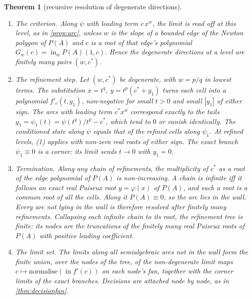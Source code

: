 \documentclass[11pt]{article}
\newtheorem{theorem}{Theorem}\newtheorem{proposition}[theorem]{Proposition}\newtheorem{lemma}[theorem]{Lemma}\newtheorem{corollary}[theorem]{Corollary}\newtheorem{conjecture}[theorem]{Conjecture}
\theoremstyle{definition}\newtheorem{definition}[theorem]{Definition}\newtheorem{remark}[theorem]{Remark}\newtheorem{example}[theorem]{Example}
\begin{document}
\begin{theorem}[recursive resolution of degenerate directions]\label{thm:degen}
\begin{enumerate}
\item[(1)] \emph{The criterion.} Along $\psi$ with leading term $c\,x^w$, the limit is read off at this level, as in \cref{prop:arc}, unless $w$
  is the slope of a bounded edge of the Newton polygon of $P(A)$ and $c$ is a root of that edge's polynomial $G_w(c)=\operatorname{in}_wP(A)(1,c)$. Hence
  the degenerate directions at a level are finitely many pairs $(w,c^*)$.
\item[(2)] \emph{The refinement step.} Let $(w,c^*)$ be degenerate, with $w=p/q$ in lowest terms. The substitution $x=t^q$, $y=t^p(c^*+y_1)$
  turns each cell into a polynomial $f'_c(t,y_1)$, non-negative for small $t>0$ and small $|y_1|$ of either sign. The arcs with leading term
  $c^*x^w$ correspond exactly to the tails $y_1=\psi_1(t)=\psi(t^q)/t^p-c^*$, which tend to $0$ or vanish identically. The conditioned state along
  $\psi$ equals that of the refined cells along $\psi_1$. At refined levels, (1) applies with non-zero real roots of either sign. The exact
  branch $\psi_1\equiv0$ is a corner: its limit sends $t\to0$ with $y_1=0$.
\item[(3)] \emph{Termination.} Along any chain of refinements, the multiplicity of $c^*$ as a root of the edge polynomial of $P(A)$ is
  non-increasing. A chain is infinite iff it follows an exact real Puiseux root $y=\varphi(x)$ of $P(A)$, and such a root is a common root of
  all the cells. Along it $P(A)\equiv0$, so the arc lies in the wall. Every arc not lying in the wall is therefore resolved after finitely
  many refinements. Collapsing each infinite chain to its root, the refinement tree is finite: its nodes are the truncations of the finitely
  many real Puiseux roots of $P(A)$ with positive leading coefficient.
\item[(4)] \emph{The limit set.} The limits along all semialgebraic arcs not in the wall form the finite union, over the nodes of the tree, of
  the non-degenerate limit maps $c\mapsto\text{normalise}(\operatorname{in}f'(c))$ on each node's fan, together with the corner limits of the exact branches.
  Decisions are attached node by node, as in \cref{thm:decisionfan}.
\end{enumerate}
\end{theorem}
\end{document}
